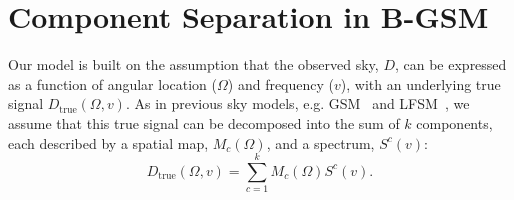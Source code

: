\documentclass[fleqn,usenatbib]{mnras}
\begin{document}
\section{Component Separation in B-GSM}
Our model is built on the assumption that the observed sky, \( D \), can be expressed as a function of angular location (\(\Omega\)) and frequency (\(v\)), with an underlying true signal \( D_\mathrm{true}(\Omega,v) \). As in previous sky models, e.g. GSM~\citep{GSM} and LFSM~\citep{LFSM}, we assume that this true signal can be decomposed into the sum of \( k \) components, each described by a spatial map, $M_c(\Omega)$, and a spectrum, $S^c(v)$:
\begin{equation}\label{eq:component_sep}
    D_\mathrm{true}(\Omega,v) = \sum_{c=1}^{k}{M_c(\Omega)S^c(v)}.
\end{equation}
\end{document}
